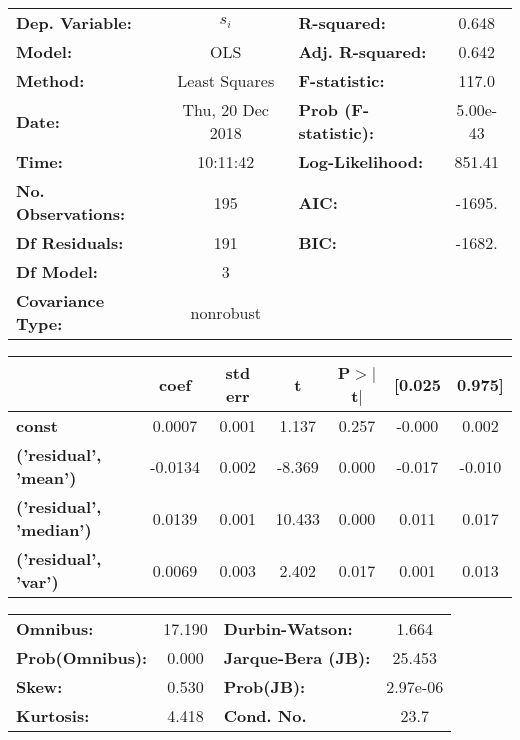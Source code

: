 \begin{center}
\begin{tabular}{lclc}
\toprule
\textbf{Dep. Variable:}    &      $s_i$       & \textbf{  R-squared:         } &    0.648  \\
\textbf{Model:}            &       OLS        & \textbf{  Adj. R-squared:    } &    0.642  \\
\textbf{Method:}           &  Least Squares   & \textbf{  F-statistic:       } &    117.0  \\
\textbf{Date:}             & Thu, 20 Dec 2018 & \textbf{  Prob (F-statistic):} & 5.00e-43  \\
\textbf{Time:}             &     10:11:42     & \textbf{  Log-Likelihood:    } &   851.41  \\
\textbf{No. Observations:} &         195      & \textbf{  AIC:               } &   -1695.  \\
\textbf{Df Residuals:}     &         191      & \textbf{  BIC:               } &   -1682.  \\
\textbf{Df Model:}         &           3      & \textbf{                     } &           \\
\textbf{Covariance Type:}  &    nonrobust     & \textbf{                     } &           \\
\bottomrule
\end{tabular}
\end{center}\begin{center}
\begin{tabular}{lcccccc}
\toprule
                                & \textbf{coef} & \textbf{std err} & \textbf{t} & \textbf{P$>$$|$t$|$} & \textbf{[0.025} & \textbf{0.975]}  \\
\midrule
\textbf{const}                  &       0.0007  &        0.001     &     1.137  &         0.257        &       -0.000    &        0.002     \\
\textbf{('residual', 'mean')}   &      -0.0134  &        0.002     &    -8.369  &         0.000        &       -0.017    &       -0.010     \\
\textbf{('residual', 'median')} &       0.0139  &        0.001     &    10.433  &         0.000        &        0.011    &        0.017     \\
\textbf{('residual', 'var')}    &       0.0069  &        0.003     &     2.402  &         0.017        &        0.001    &        0.013     \\
\bottomrule
\end{tabular}
\end{center}\begin{center}
\begin{tabular}{lclc}
\toprule
\textbf{Omnibus:}       & 17.190 & \textbf{  Durbin-Watson:     } &    1.664  \\
\textbf{Prob(Omnibus):} &  0.000 & \textbf{  Jarque-Bera (JB):  } &   25.453  \\
\textbf{Skew:}          &  0.530 & \textbf{  Prob(JB):          } & 2.97e-06  \\
\textbf{Kurtosis:}      &  4.418 & \textbf{  Cond. No.          } &     23.7  \\
\bottomrule
\end{tabular}
\end{center}